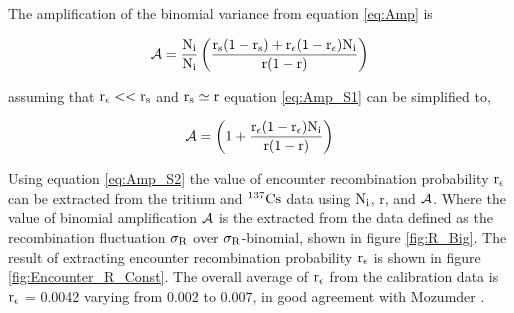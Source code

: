 The amplification of the binomial variance from equation \ref{eq:Amp} is

\begin{equation}
\rm \mathcal{A} =\frac{N_i}{N_i} \left( \frac{ r_s(1-r_s) + r_\epsilon(1-r_\epsilon)N_i }{ r(1-r) } \right)
\label{eq:Amp_S1}
\end{equation}

\noindent assuming that $\rm r_\epsilon << r_s$ and $\rm r_s \simeq r$ equation \ref{eq:Amp_S1} can be simplified to, 

\begin{equation}
\rm \mathcal{A} =\left(1 +  \frac{ r_\epsilon(1-r_\epsilon)N_i }{ r(1-r) } \right)
\label{eq:Amp_S2}
\end{equation}
 
\noindent  Using equation \ref{eq:Amp_S2} the value of encounter recombination probability $\rm r_\epsilon$ can be extracted from the tritium and $\rm^{137}Cs$ data using $\rm N_i$, r, and $\rm \mathcal{A}$.  Where the value of binomial amplification $\rm \mathcal{A}$ is the extracted from the data defined as the recombination fluctuation $\rm \sigma_R$ over $\rm \sigma_R$-binomial, shown in figure \ref{fig:R_Big}. The result of extracting encounter recombination probability $\rm r_\epsilon$ is shown in figure \ref{fig:Encounter_R_Const}. The overall average of  $\rm r_\epsilon$ from the calibration data is $\rm r_\epsilon$ = 0.0042 varying from 0.002 to 0.007, in good agreement with Mozumder \cite{Mozumder}.


